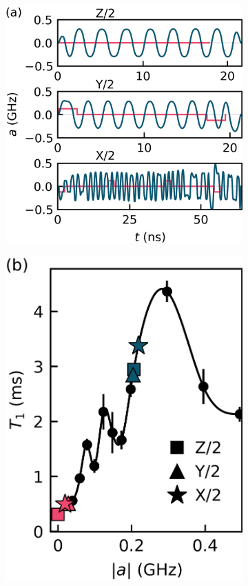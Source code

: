 \begin{figure}[ht]
  \begin{subfigure}{.315\textwidth}
    \includegraphics[width=\linewidth]{assets/f1a.png}
    \caption{\label{fig:longitudea}}
  \end{subfigure}\hfill
  \begin{subfigure}{.23\textwidth}
    \includegraphics[width=\linewidth]{assets/f1b.png}

\end{subfigure}
\end{figure}
